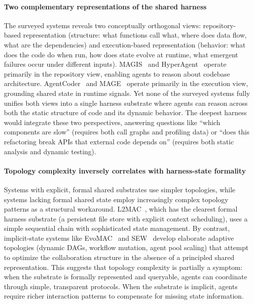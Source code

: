 \paragraph{Two complementary representations of the shared harness}
The surveyed systems reveals two conceptually orthogonal views:
repository-based representation (structure: what functions call
what, where does data flow, what are the dependencies) and
execution-based representation (behavior: what does the code do
when run, how does state evolve at runtime, what emergent
failures occur under different inputs). MAGIS~\cite{Tao2024Magis}
and HyperAgent~\cite{Phan2024HyperAgent} operate primarily in the
repository view, enabling agents to reason about codebase
architecture. AgentCoder~\cite{huang2023agentcoder} and
MAGE~\cite{Zhao2024MAGE} operate primarily in the execution view,
grounding shared state in runtime signals. Yet none of the
surveyed systems fully unifies both views into a single harness
substrate where agents can reason across both the static
structure of code and its dynamic behavior. The deepest harness
would integrate these two perspectives, answering questions like
``which components are slow'' (requires both call graphs and
profiling data) or ``does this refactoring break APIs that
external code depends on'' (requires both static analysis and
dynamic testing).

\paragraph{Topology complexity inversely correlates with harness-state formality}
Systems with explicit, formal shared substrates use simpler
topologies, while systems lacking formal shared state employ
increasingly complex topology patterns as a structural
workaround. L2MAC~\cite{Holt2023L2MAC}, which has the clearest
formal harness substrate (a persistent file store with explicit
context scheduling), uses a simple sequential chain with
sophisticated state management. By contrast,
implicit-state systems like EvoMAC~\cite{Hu2025EvoMAC} and
SEW~\cite{Liu2025SEW} develop elaborate adaptive topologies
(dynamic DAGs, workflow mutation, agent pool scaling) that
attempt to optimize the collaboration structure in the absence of
a principled shared representation. This suggests that topology
complexity is partially a symptom: when the substrate is
formally represented and queryable, agents can coordinate through
simple, transparent protocols. When the substrate is implicit,
agents require richer interaction patterns to compensate for
missing state information.

